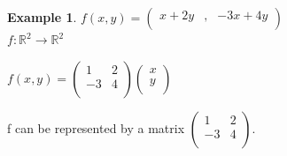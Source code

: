 \documentclass[11pt,a4paper]{article}
\theoremstyle{definition}
\newtheorem{exa}[thm]{Example}
\begin{document}
\begin{exa}


$f(x,y) = \begin{pmatrix}
x + 2y & , & -3x + 4y\\
\end{pmatrix}$\\

$f:\mathbb{R}^2 \longrightarrow \mathbb{R}^2$


$\displaystyle{f(x,y) = 
\begin{pmatrix}
1 & 2\\
-3 & 4\\
\end{pmatrix}
\begin{pmatrix}
x\\
y\\
\end{pmatrix}
}$


f can be represented by a matrix $
\begin{pmatrix}
1 & 2\\
-3 & 4\\
\end{pmatrix}$.\\\\
\end{exa}
\end{document}

